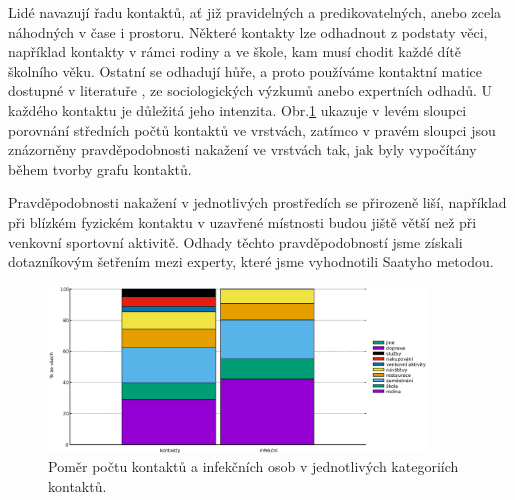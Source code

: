 Lidé navazují řadu kontaktů, ať již pravidelných a predikovatelných, anebo zcela náhodných v čase i prostoru. 
Některé kontakty lze odhadnout z podstaty věci, například kontakty v rámci rodiny a ve škole, kam musí chodit každé dítě školního věku. Ostatní se odhadují hůře, a proto používáme kontaktní matice dostupné v literatuře \cite{Prem_etal2017}, ze sociologických výzkumů anebo expertních odhadů. 
U každého kontaktu je důležitá jeho intenzita. Obr.\ref{kategorie} ukazuje v levém sloupci porovnání středních počtů kontaktů ve vrstvách, zatímco v pravém sloupci jsou znázorněny pravděpodobnosti nakažení ve vrstvách tak, jak byly vypočítány během tvorby grafu kontaktů.


Pravděpodobnosti nakažení v jednotlivých prostředích se přirozeně liší, například při blízkém fyzickém kontaktu v uzavřené místnosti budou jiště větší než při venkovní sportovní aktivitě. Odhady těchto pravděpodobností jsme získali dotazníkovým šetřením mezi experty, které jsme vyhodnotili Saatyho metodou.

\begin{figure}
    \centering
    \includegraphics[width=10cm]{pic/filled_cz.eps}
    \caption{Poměr počtu kontaktů a infekčních osob v jednotlivých kategoriích kontaktů.}
    \label{kategorie}
\end{figure}

